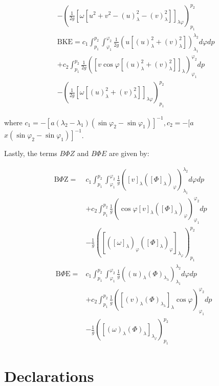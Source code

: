 \documentclass[pdflatex,sn-chicago]{sn-jnl}%
\theoremstyle{plain}
\theoremstyle{definition}
\theoremstyle{remark}
\theoremstyle{definition}
\begin{document}
\begin{align}
& -\left(\frac{1}{2 g}\left[\omega\left[u^2+v^2-(u)_\lambda^2-(v)_\lambda^2\right]\right]_{\lambda \varphi}\right)_{p_1}^{p_2} \nonumber \\
& \mathrm{BKE}=c_1 \int_{p_1}^{p_2} \int_{\varphi_1}^{\varphi_2} \frac{1}{2 g}\left(u\left[(u)_\lambda^2+(v)_\lambda^2\right]\right)_{\lambda_1}^{\lambda_2} d \varphi d p \nonumber \\
& +c_2 \int_{p_1}^{p_2} \frac{1}{2 g}\left(\left[v \cos \varphi\left[(u)_\lambda^2+(v)_\lambda^2\right]\right]_\lambda\right)_{\varphi_1}^{\varphi_2} d p \\
& -\left(\frac{1}{2 g}\left[\omega\left[(u)_\lambda^2+(v)_\lambda^2\right]\right]_{\lambda \varphi}\right)_{p_1}^{p_2} \nonumber
\end{align}

where $c_1=-\left[a\left(\lambda_2-\lambda_1\right)\left(\sin \varphi_2-\sin \varphi_1\right)\right]^{-1}, c_2=-[a$ $\left.x\left(\sin \varphi_2-\sin \varphi_1\right)\right]^{-1}$.


Lastly, the terms $B\Phi Z$ and $B\Phi E$ are given by:

\begin{align}
\mathrm{B} \Phi \mathrm{Z}= & c_1 \int_{p_1}^{p_2} \int_{\varphi_1}^{\varphi_2} \frac{1}{g}\left([v]_\lambda\left([\Phi]_\lambda\right)_{\varphi}\right)_{\lambda_1}^{\lambda_2} d \varphi d p \nonumber \\
& +c_2 \int_{p_1}^{p_2} \frac{1}{g}\left(\cos \varphi[v]_\lambda\left([\Phi]_\lambda\right)_{\varphi}\right)_{\varphi_1}^{\varphi_2} d p  \\
& -\frac{1} {g}\left(\left[\left([\omega]_\lambda\right)_{\varphi}\left([\Phi]_\lambda\right)_{\varphi}\right]_{\lambda_{\varphi}}\right)_{p_1}^{p_2} \nonumber \\
\mathrm{~B} \Phi \mathrm{E}= & c_1 \int_{p_1}^{p_2} \int_{\varphi_1}^{\varphi_2} \frac{1}{g}\left((u)_\lambda(\Phi)_{\lambda_\lambda}\right)_{\lambda_1}^{\lambda_2} d \varphi d p \nonumber \\
& +c_2 \int_{p_1}^{p_2} \frac{1}{g}\left(\left[(v)_\lambda(\Phi)_{\lambda_\lambda}\right]_\lambda \cos \varphi\right)_{\varphi_1}^{\varphi_2} d p \\
& -\frac{1}{g}\left(\left[(\omega)_\lambda(\Phi)_\lambda\right]_{\lambda_{\varphi}}\right)_{p_1}^{p_2} \nonumber
\end{align}

\section*{Declarations}
\end{document}
